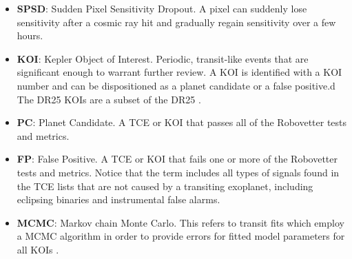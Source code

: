 \begin{itemize}
\item[] \textbf{SPSD}: Sudden Pixel Sensitivity Dropout.  A pixel can suddenly lose sensitivity after a cosmic ray hit and gradually regain sensitivity over a few hours.
\item[] \textbf{KOI}: Kepler Object of Interest. Periodic, transit-like events that are significant enough to warrant further review. A KOI is identified with a KOI number and can be dispositioned as a planet candidate or a false positive.d  The DR25 KOIs are a subset of the DR25 .
\item[] \textbf{PC}: Planet Candidate. A TCE or KOI that passes all of the Robovetter tests and metrics. 
\item[] \textbf{FP}: False Positive. A TCE or KOI that fails one or more of the Robovetter tests and metrics. Notice that the term includes all types of signals found in the TCE lists that are not caused by a transiting exoplanet, including eclipsing binaries and instrumental false alarms.
\item[] \textbf{MCMC}: Markov chain Monte Carlo. This refers to transit fits which employ a MCMC algorithm in order to provide errors for fitted model parameters for all KOIs
 \citep{Hoffman2017}.



\end{itemize}